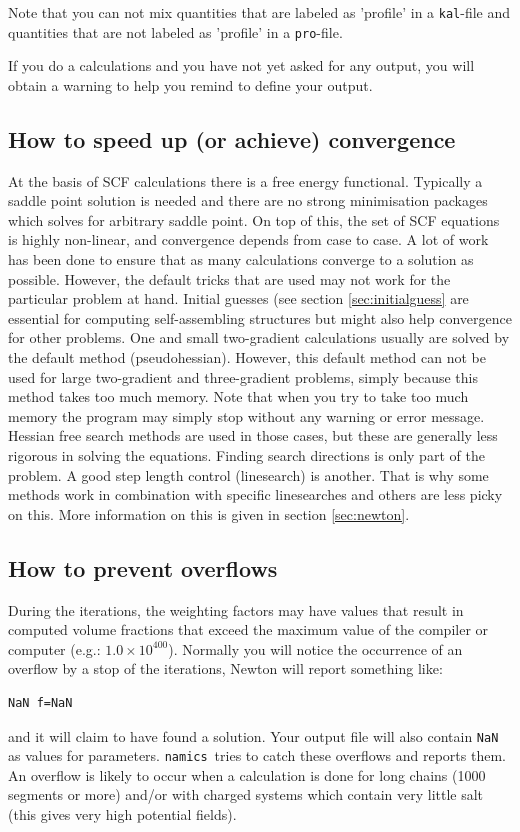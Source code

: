 \documentclass{article}
\newcommand{\namics}{{\tt namics}}
\begin{document}
 Note that you can not mix quantities that are labeled as 'profile' in a {\tt kal}-file and quantities that are not labeled as 'profile' in a {\tt pro}-file. 

If you do a calculations and you have not yet asked for any output, you will obtain a warning to help you remind to define your output. 

\subsection{How to speed up (or achieve) convergence}
At the basis of SCF calculations there is a free energy functional. Typically a saddle point solution is needed and there are no strong minimisation packages which solves for arbitrary saddle point. On top of this, the set of SCF equations is highly non-linear, and convergence depends from case to case. A lot of work has been done to ensure that as many calculations converge to a solution as possible. However, the default tricks that are used may not work for the particular problem at hand. Initial guesses (see section \ref{sec:initialguess} are essential for computing self-assembling structures but might also help convergence for other problems. One and small two-gradient calculations usually are solved by the default method (pseudohessian). However, this default method can not be used for large two-gradient and three-gradient problems, simply because this method takes too much memory. Note that when you try to take too much memory the  program may simply stop without any warning or error message. Hessian free search methods are used in those cases, but these are generally less rigorous in solving the equations. Finding search directions is only part of the problem. A good step length control (linesearch) is another. That is why some methods work in combination with specific linesearches and others are less picky on this. More information on this is given in section \ref{sec:newton}.

\subsection{How to prevent overflows}
\label{sec:overflow}
During the iterations, the weighting factors may have values that result in computed volume fractions that exceed the maximum value of the compiler or computer (e.g.: $1.0 \times 10^{400}$).  Normally you will notice the occurrence of an overflow by a stop of the iterations, Newton will report something like:
\begin{verbatim}
NaN f=NaN
\end{verbatim}
and it will claim to have found a solution.  Your output file will also contain {\tt NaN} as values for parameters.  \namics\ tries to catch these overflows and reports them.  An overflow is likely to occur when a calculation is done for long chains (1000 segments or more) and/or with charged systems which contain very little salt (this gives very high potential fields).  
\end{document}
